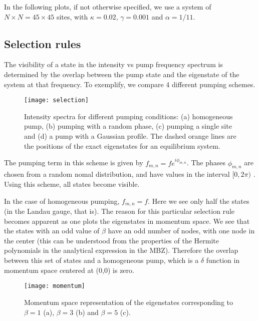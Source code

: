 \documentclass[twocolumn, 10pt, aps, superscriptaddress, floatfix, showpacs, prb, citeautoscript]{revtex4-1}
\newcommand{\co}[2]{#2}
\renewcommand{\paragraph}{\co}
\begin{document}
In the following plots, if not otherwise specified, we use a system of $N \times N = 45 \times 45$ sites, with $\kappa =
0.02$, $\gamma = 0.001$ and $\alpha = 1/11$.

\subsection{Selection rules}
\label{sec:selection}

The visibility of a state in the intensity vs pump frequency spectrum
is determined by the overlap between the pump state and the eigenstate
of the system at that frequency.  To exemplify, we compare 4 different
pumping schemes.

\begin{figure}[htb]
  \centerline{\texttt{[image: selection]}}
  \caption{Intensity spectra for different pumping conditions: (a)
    homogeneous pump, (b) pumping with a random phase, (c) pumping a
    single site and (d) a pump with a Gaussian profile. The dashed
    orange lines are the positions of the exact eigenstates for an
    equilibrium system.}
  \label{fig:pumping_schemes}
\end{figure}



\paragraph{Random phase}
The pumping term in this scheme is given by
$f_{m,n}=fe^{i\phi_{m,n}}$. The phases $\phi_{m,n}$ are chosen
from a random nomal distribution, and have values in the interval
$[0,2\pi)$ . Using this scheme, all states become visible.

\paragraph{Homogeneous pumping}
In the case of homogeneous pumping, $f_{m,n} = f$. Here we see only
half the states (in the Landau gauge, that is). The reason for this
particular selection rule becomes apparent as one plots the
eigenstates in momentum space. We see that the states with an odd
value of $\beta$ have an odd number of nodes, with one node in the
center (this can be understood from the properties of the Hermite
polynomials in the analytical expression in the MBZ). Therefore the
overlap between this set of states and a homogeneous pump, which is a
$\delta$ function in momentum space centered at (0,0) is zero.

\begin{figure}[htb]
  \centerline{\texttt{[image: momentum]}}
  \caption{Momentum space representation of the eigenstates
    corresponding to $\beta=1$ (a), $\beta=3$ (b) and $\beta=5$ (c).}
  \label{fig:hom_mom_sp}
\end{figure}
\end{document}
